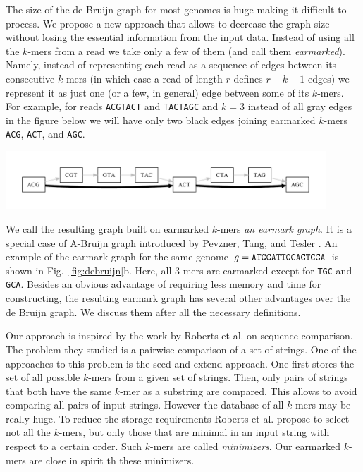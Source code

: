 \documentclass[12pt]{article}
\begin{document}
The size of the de Bruijn graph for most genomes is huge making
it difficult to process. 
We propose a new approach that allows to decrease
the graph size without losing the essential information from the input data.
Instead of using all the $k$-mers from a read we take only a few of them
(and call them \emph{earmarked}).
Namely, instead 
of representing each read as a sequence of edges 
between its consecutive $k$-mers (in which case a read of length $r$ defines
$r-k-1$ edges) we represent it as just one (or a few, in general)
edge between some of its $k$-mers. For example, for 
reads {\tt ACGTACT} and {\tt TACTAGC} and $k=3$
instead of all gray edges in the figure below we will have 
only two black edges joining earmarked $k$-mers {\tt ACG}, {\tt ACT}, and {\tt AGC}.{}
\begin{center}
\includegraphics[width=0.9\textwidth]{fig1.pdf}
\end{center}
We call the resulting graph built on earmarked $k$-mers \emph{an earmark graph}.
It is a special case of A-Bruijn graph introduced by Pevzner, Tang, and Tesler \cite{PTG04}.
An example of the earmark graph for the same genome $g={\tt ATGCATTGCACTGCA}$ is shown in Fig.~\ref{fig:debruijn}b.
Here, all $3$-mers are earmarked except for {\tt TGC} and {\tt GCA}.
Besides an obvious advantage of requiring less memory 
and time for constructing, the resulting earmark graph has several other advantages over the
de Bruijn graph. We discuss them after all the necessary definitions.

Our approach is inspired by the work by Roberts et al. \cite{RW04} on sequence comparison.
The problem they studied is a pairwise comparison of a set of strings. 
One of the approaches to this problem is the seed-and-extend approach.
One first stores the set of all possible $k$-mers from a given set of strings.
Then, only pairs of strings that both have the same $k$-mer as a substring are compared.
This allows to avoid comparing all pairs of input strings. However the database
of all $k$-mers may be really huge. To reduce the storage requirements Roberts et al. propose
to select not all the $k$-mers, but only those that are minimal in an input string with respect
to a certain order. Such $k$-mers are called \emph{minimizers}. Our earmarked $k$-mers are close in spirit 
th these minimizers.
\end{document}
